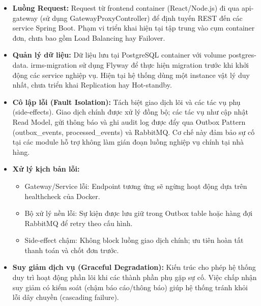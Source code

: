 \begin{itemize}
    \item \textbf{Luồng Request:} Request từ \textsf{frontend container} (React/Node.js) đi qua \textsf{api-gateway} (sử dụng \textsf{GatewayProxyController}) để định tuyến REST đến các service Spring Boot. Phạm vi triển khai hiện tại tập trung vào cụm container đơn, chưa bao gồm Load Balancing hay Failover.
    
    \item \textbf{Quản lý dữ liệu:} Dữ liệu lưu tại \textsf{PostgreSQL container} với volume \textsf{postgres-data}. \textsf{irms-migration} sử dụng Flyway để thực hiện migration trước khi khởi động các service nghiệp vụ. Hiện tại hệ thống dùng một instance vật lý duy nhất, chưa triển khai Replication hay Hot-standby.
    
    \item \textbf{Cô lập lỗi (Fault Isolation):} Tách biệt giao dịch lõi và các tác vụ phụ (side-effects). Giao dịch chính được xử lý đồng bộ; các tác vụ như cập nhật Read Model, gửi thông báo và ghi audit log được đẩy qua Outbox Pattern (\textsf{outbox\_events}, \textsf{processed\_events}) và \textsf{RabbitMQ}. Cơ chế này đảm bảo sự cố tại các module hỗ trợ không làm gián đoạn luồng nghiệp vụ chính tại nhà hàng.
    
    \item \textbf{Xử lý kịch bản lỗi:}
    \begin{itemize}
        \item \textsf{Gateway/Service} lỗi: Endpoint tương ứng sẽ ngừng hoạt động dựa trên healthcheck của Docker.
        \item Bộ xử lý nền lỗi: Sự kiện được lưu giữ trong Outbox table hoặc hàng đợi \textsf{RabbitMQ} để retry theo cấu hình.
        \item Side-effect chậm: Không block luồng giao dịch chính; ưu tiên hoàn tất thanh toán và chốt đơn trước.
    \end{itemize}
    
    \item \textbf{Suy giảm dịch vụ (Graceful Degradation):} Kiến trúc cho phép hệ thống duy trì hoạt động phần lõi khi các thành phần phụ gặp sự cố. Việc chấp nhận suy giảm có kiểm soát (chậm báo cáo/thông báo) giúp hệ thống tránh khỏi lỗi dây chuyền (cascading failure).
\end{itemize}
